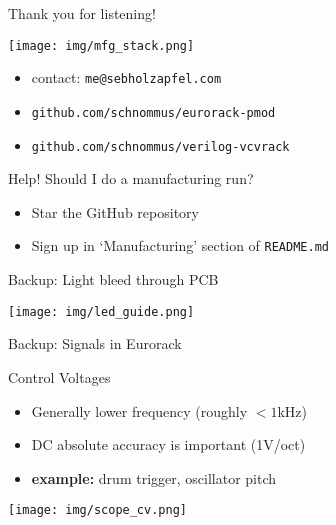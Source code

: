 \documentclass[aspectratio=169]{beamer}
\begin{document}
\begin{frame}{Thank you for listening!}

    \begin{center}
        \texttt{[image: img/mfg\_stack.png]}
    \end{center}

    \begin{itemize}
        \item contact: \texttt{me@sebholzapfel.com}
        \item \texttt{github.com/schnommus/eurorack-pmod}
        \item \texttt{github.com/schnommus/verilog-vcvrack}
    \end{itemize}

    \begin{block}{Help! Should I do a manufacturing run?}
        \begin{itemize}
            \item Star the GitHub repository
            \item Sign up in `Manufacturing' section of \texttt{README.md}
        \end{itemize}
    \end{block}


\end{frame}

\begin{frame}{Backup: Light bleed through PCB}
    \begin{center}
        \texttt{[image: img/led\_guide.png]}
    \end{center}
\end{frame}

\begin{frame}{Backup: Signals in Eurorack}
    \begin{block}{Control Voltages}
        \begin{itemize}
            \item Generally lower frequency (roughly $<1$kHz)
            \item DC absolute accuracy is important (1V/oct)
            \item \textbf{example:} drum trigger, oscillator pitch
        \end{itemize}
    \end{block}
    \begin{center}
        \texttt{[image: img/scope\_cv.png]}
    \end{center}
\end{frame}
\end{document}
